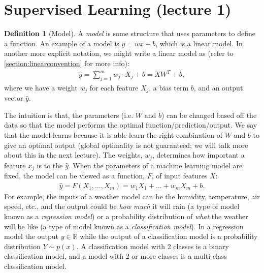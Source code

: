 \documentclass[11pt]{article}
\numberwithin{equation}{section}
\theoremstyle{definition}%
\newtheorem{definition}{Definition}[section]%
\begin{document}
\noindent
\section*{}
\subsection*{}

\section{Supervised Learning (lecture 1)}
\begin{definition}[Model]
A \emph{model} is some structure that uses parameters to define a function. An example of a model is $y= wx + b$, which is a linear model. In another more explicit notation, we might write a linear model as (refer to \autoref{section:linearconvention} for more info):
\begin{align}
    \hat{y} = \sum_{j=1}^{m}{w_j \cdot X_j + b} = XW^{T} + b,
\end{align}
where we have a weight $w_j$ for each feature $X_j$, a bias term $b$, and an output vector $\hat{y}$. 
\end{definition}

The intuition is that, the parameters (i.e. $W$ and $b$) can be changed based off the data so that the model performs the optimal function/prediction/output. We say that the model learns because it is able learn the right combination of $W$ and $b$ to give an optimal output (global optimality is not guaranteed; we will talk more about this in the next lecture). The weights, $w_j$, determines how important a feature $x_j$ is to the $\hat{y}$. When the parameters of a machine learning model are fixed, the model can be viewed as a function, $F$, of input features $X$:
\begin{align}
    \hat{y} = F(X_1, ..., X_m) = w_1 X_1 + ... + w_m X_m + b.
\end{align}
For example, the inputs of a weather model can be the humidity, temperature, air speed, etc., and the output could be \emph{how much} it will rain (a type of model known as a \emph{regression model}) or a probability distribution of \emph{what} the weather will be like (a type of model known as a \emph{classification model}). In a regression model the output $y \in \mathbb{R}$ while the output of a classification model is a probability distribution $Y \sim p(x)$. A classification model with 2 classes is a binary classification model, and a model with 2 or more classes is a multi-class classification model.
\end{document}
